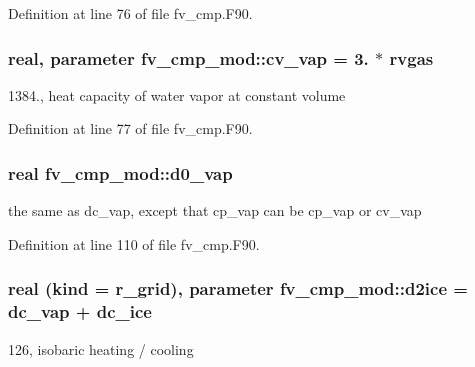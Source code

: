 Definition at line 76 of file fv\-\_\-cmp.\-F90.

\subsubsection[{cv\-\_\-vap}]{\setlength{\rightskip}{0pt plus 5cm}real, parameter fv\-\_\-cmp\-\_\-mod\-::cv\-\_\-vap = 3. $\ast$ rvgas\hspace{0.3cm}{\ttfamily [private]}}\label{classfv__cmp__mod_a1aff52f3ef1654b16d21ca8deade4099}


1384., heat capacity of water vapor at constant volume 



Definition at line 77 of file fv\-\_\-cmp.\-F90.

\subsubsection[{d0\-\_\-vap}]{\setlength{\rightskip}{0pt plus 5cm}real fv\-\_\-cmp\-\_\-mod\-::d0\-\_\-vap\hspace{0.3cm}{\ttfamily [private]}}\label{classfv__cmp__mod_ac3f9f88a1d49ff1e327bbb8005f9228a}


the same as dc\-\_\-vap, except that cp\-\_\-vap can be cp\-\_\-vap or cv\-\_\-vap 



Definition at line 110 of file fv\-\_\-cmp.\-F90.

\subsubsection[{d2ice}]{\setlength{\rightskip}{0pt plus 5cm}real (kind = r\-\_\-grid), parameter fv\-\_\-cmp\-\_\-mod\-::d2ice = {\bf dc\-\_\-vap} + {\bf dc\-\_\-ice}\hspace{0.3cm}{\ttfamily [private]}}\label{classfv__cmp__mod_adb9c6f0494c4e168f9730598a667d15a}

\begin{DoxyItemize}
\item 126, isobaric heating / cooling 
\end{DoxyItemize}


